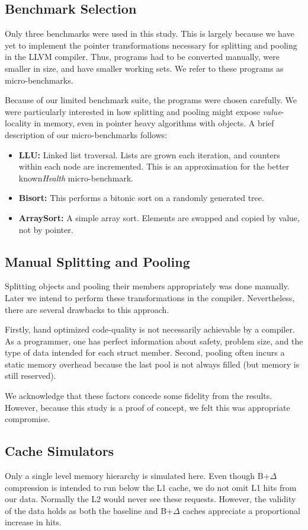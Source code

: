 \documentclass[pageno]{jpaper}
\begin{document}
\subsection{Benchmark Selection}
Only three benchmarks were used in this study. This is largely because we have yet to implement the pointer transformations necessary for splitting and pooling in the LLVM compiler. Thus, programs had to be converted manually, were smaller in size, and have smaller working sets. We refer to these programs as micro-benchmarks.

Because of our limited benchmark suite, the programs were chosen carefully. We were particularly interested in how splitting and pooling might expose \textit{value}-locality in memory, even in pointer heavy algorithms with objects. A brief description of our micro-benchmarks follows:

\begin{itemize}
\item{\textbf{LLU:} Linked list traversal. Lists are grown each iteration, and counters within each node are incremented. This is an approximation for the better known\textit{Health} micro-benchmark.}
\item{\textbf{Bisort:} This performs a bitonic sort on a randomly generated tree.}
\item{\textbf{ArraySort:} A simple array sort. Elements are swapped and copied by value, not by pointer.}
\end{itemize}


\subsection{Manual Splitting and Pooling}
Splitting objects and pooling their members appropriately was done manually. Later we intend to perform these transformations in the compiler. Nevertheless, there are several drawbacks to this approach.

Firstly, hand optimized code-quality is not necessarily achievable by a compiler. As a programmer, one has perfect information about safety, problem size, and the type of data intended for each struct member. Second, pooling often incurs a static memory overhead\cite{mpads}  because the last pool is not always filled (but memory is still reserved).

We acknowledge that these factors concede some fidelity from the results. However, because this study is a proof of concept, we felt this was appropriate compromise.


\subsection{Cache Simulators}
Only a single level memory hierarchy is simulated here. Even though B+$\Delta$ compression is intended to run below the L1 cache, we do not omit L1 hits from our data. Normally the L2 would never see these requests. However, the validity of the data holds as both the baseline and B+$\Delta$ caches appreciate a proportional increase in hits.
\end{document}
